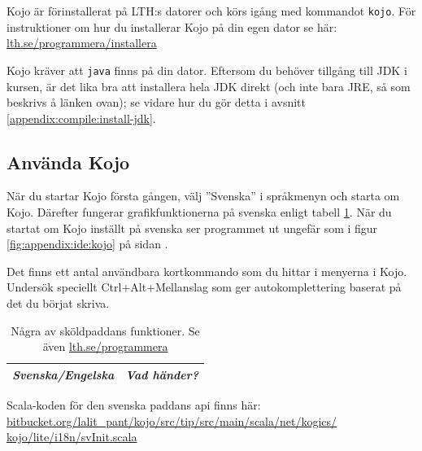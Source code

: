 Kojo är förinstallerat på LTH:s datorer och körs igång med kommandot \texttt{kojo}. För instruktioner om hur du installerar Kojo på din egen dator se här:\\
\href{http://www.lth.se/programmera/installera/}{lth.se/programmera/installera}

Kojo kräver att \texttt{java} finns på din dator. Eftersom du behöver tillgång till JDK i kursen, är det lika bra att installera hela JDK direkt (och inte bara JRE, så som beskrivs å länken ovan); se vidare hur du gör detta i avsnitt \ref{appendix:compile:install-jdk}. 


\subsection{Använda Kojo}

När du startar Kojo första gången, välj ''Svenska'' i språkmenyn och starta om Kojo. Därefter fungerar grafikfunktionerna på svenska enligt tabell \ref{table:kojo:functions}. När du startat om Kojo inställt på svenska ser programmet ut ungefär som i figur \ref{fig:appendix:ide:kojo} på sidan \pageref{fig:appendix:ide:kojo}.


Det finns ett antal användbara kortkommando som du hittar i menyerna i Kojo. Undersök speciellt Ctrl+Alt+Mellanslag som ger autokomplettering baserat på det du börjat skriva.


{\small\renewcommand{\arraystretch}{1.45}
\begin{longtable}{@{}p{} p{}}

\caption{Några av sköldpaddans funktioner. Se även \href{http://lth.se/programmera}{lth.se/programmera}}\label{table:kojo:functions}\\

\emph{Svenska/Engelska} & \emph{Vad händer?}  \\ \hline


\hline
\end{longtable}
}%

\noindent Scala-koden för den svenska paddans api finns här: \\
\href{https://bitbucket.org/lalit_pant/kojo/src/tip/src/main/scala/net/kogics/kojo/lite/i18n/svInit.scala}{bitbucket.org/lalit\_pant/kojo/src/tip/src/main/scala/net/kogics/\\kojo/lite/i18n/svInit.scala}




